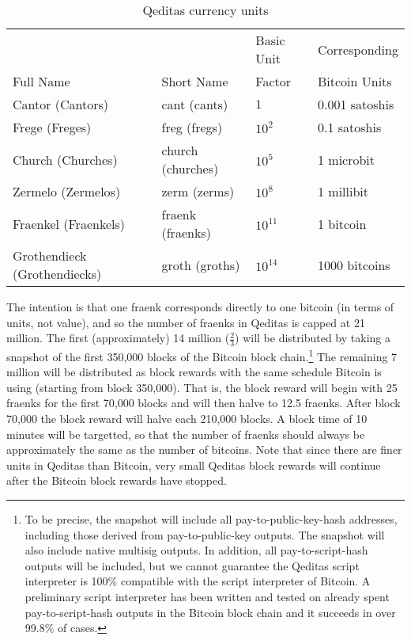 \documentclass{article}
\begin{document}
\begin{table}
\begin{center}
{\scriptsize{
\begin{tabular}{llll}
& & {\scriptsize{Basic Unit}} & {\scriptsize{Corresponding}} \\
{\scriptsize{Full Name}} & {\scriptsize{Short Name}} & {\scriptsize{Factor}} & {\scriptsize{Bitcoin Units}} \\ \hline
Cantor (Cantors) & cant (cants) & $1$ & 0.001 satoshis \\
Frege (Freges) & freg (fregs) & $10^2$ & 0.1 satoshis \\
Church (Churches) & church (churches) & $10^5$ & 1 microbit \\
Zermelo (Zermelos) & zerm (zerms) & $10^8$ & 1 millibit \\
Fraenkel (Fraenkels) & fraenk (fraenks) & $10^{11}$ & 1 bitcoin \\
Grothendieck (Grothendiecks) & groth (groths) & $10^{14}$ & 1000 bitcoins
\end{tabular}
}}
\end{center}
\caption{Qeditas currency units}\label{tab:currencyunits}
\end{table}

The intention is that one fraenk corresponds directly to one bitcoin
(in terms of units, not value),
and so the number of fraenks in Qeditas is capped at 21 million.
The first (approximately) 14 million ($\frac{2}{3}$) will be distributed by taking a snapshot of the
first 350,000 blocks of the Bitcoin block chain.\footnote{To be precise, the snapshot will include all pay-to-public-key-hash addresses, including those derived from pay-to-public-key outputs. The snapshot will also include native multisig outputs. In addition, all pay-to-script-hash outputs will be included, but we cannot guarantee the Qeditas script interpreter is 100\% compatible with the script interpreter of Bitcoin. A preliminary script interpreter has been written and tested on already spent pay-to-script-hash outputs in the Bitcoin block chain and it succeeds in over 99.8\% of cases.}
The remaining 7 million will be distributed as block rewards with
the same schedule Bitcoin is using (starting from block 350,000). That is, the block reward will
begin with 25 fraenks for the first 70,000 blocks
and will then halve to 12.5 fraenks. After block 70,000
the block reward will halve each 210,000 blocks.
A block time of 10 minutes will be targetted, so that the number of fraenks
should always be approximately the same as the number of bitcoins.
Note that since there are finer units in Qeditas than Bitcoin,
very small Qeditas block rewards will continue after the Bitcoin block
rewards have stopped.
\end{document}
